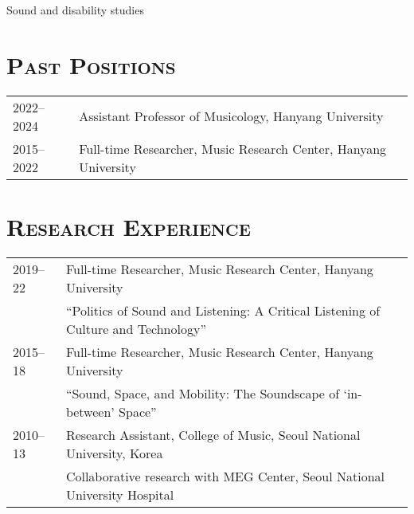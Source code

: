 \documentclass[a4paper,11pt,draft]{article}
\begin{document}
  \noindent \hspace{2mm} \textbullet \hspace{2mm} Sound and disability studies
  
  \vspace{2.5mm}
  
  \section*{\textsc{Past Positions}}
  
  \hspace*{-0.25cm}
  \begin{tabular}{p{2.5cm} l}
    2022--2024 & Assistant Professor of Musicology, Hanyang University\\
    2015--2022 & Full-time Researcher, Music Research Center, Hanyang
    University
  \end{tabular}
  
  \vspace*{5mm}
  
  \section*{\textsc{Research Experience}}
  
  \hspace*{-0.25cm}
  \begin{tabular}{p{2.5cm} l}
    2019--22 & Full-time Researcher, Music Research Center, Hanyang
    University\\
    & ``Politics of Sound and Listening: A Critical Listening of Culture and
    Technology''\\
    2015--18 & Full-time Researcher, Music Research Center, Hanyang University\\
    & ``Sound, Space, and Mobility: The Soundscape of ‘in-between’ Space''\\
    2010--13 & Research Assistant, College of Music, Seoul National University,
    Korea\\
    & Collaborative research with MEG Center, Seoul National University
    Hospital
  \end{tabular}
  
  \vspace*{5mm}
  
\end{document}
